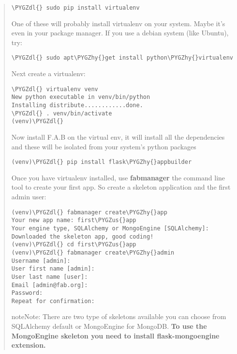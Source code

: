 \documentclass[letterpaper,10pt,english]{sphinxmanual}
\def\PYGZus{\char`\_}
\def\PYGZdl{\char`\$}
\def\PYGZhy{\char`\-}
\begin{document}
\begin{itemize}
\begin{quote}
\begin{Verbatim}[commandchars=\\\{\}]
\PYGZdl{} sudo pip install virtualenv
\end{Verbatim}

One of these will probably install virtualenv on your system.
Maybe it’s even in your package manager. If you use a debian system (like Ubuntu), try:

\begin{Verbatim}[commandchars=\\\{\}]
\PYGZdl{} sudo apt\PYGZhy{}get install python\PYGZhy{}virtualenv
\end{Verbatim}

Next create a virtualenv:

\begin{Verbatim}[commandchars=\\\{\}]
\PYGZdl{} virtualenv venv
New python executable in venv/bin/python
Installing distribute............done.
\PYGZdl{} . venv/bin/activate
(venv)\PYGZdl{}
\end{Verbatim}

Now install F.A.B on the virtual env,
it will install all the dependencies and these will be isolated from your system's python packages

\begin{Verbatim}[commandchars=\\\{\}]
(venv)\PYGZdl{} pip install flask\PYGZhy{}appbuilder
\end{Verbatim}

Once you have virtualenv installed, use \textbf{fabmanager} the command line tool to create your first app.
So create a skeleton application and the first admin user:

\begin{Verbatim}[commandchars=\\\{\}]
(venv)\PYGZdl{} fabmanager create\PYGZhy{}app
Your new app name: first\PYGZus{}app
Your engine type, SQLAlchemy or MongoEngine [SQLAlchemy]:
Downloaded the skeleton app, good coding!
(venv)\PYGZdl{} cd first\PYGZus{}app
(venv)\PYGZdl{} fabmanager create\PYGZhy{}admin
Username [admin]:
User first name [admin]:
User last name [user]:
Email [admin@fab.org]:
Password:
Repeat for confirmation:
\end{Verbatim}

\begin{notice}{note}{Note:}
There are two type of skeletons available you can choose from SQLAlchemy default or MongoEngine for
MongoDB. \textbf{To use the MongoEngine skeleton you need to install flask-mongoengine extension.}
\end{notice}


\end{quote}
\end{itemize}
\end{document}
